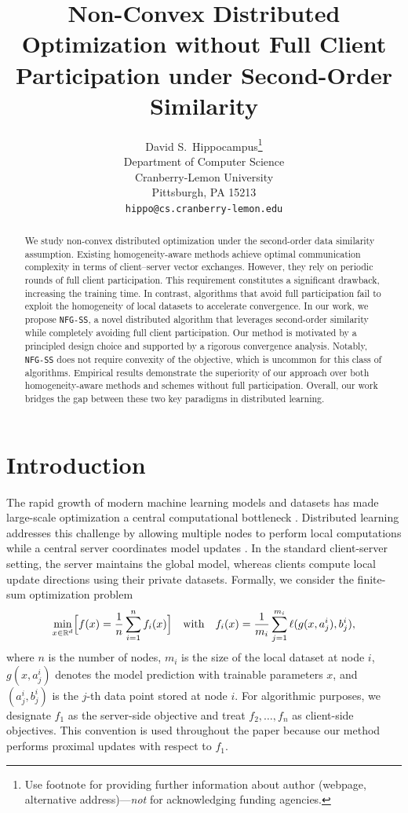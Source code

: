 \documentclass{article}
\title{Non-Convex Distributed Optimization without Full Client Participation under Second-Order Similarity}
\author{%
  David S.~Hippocampus\thanks{Use footnote for providing further information
    about author (webpage, alternative address)---\emph{not} for acknowledging
    funding agencies.} \\
  Department of Computer Science\\
  Cranberry-Lemon University\\
  Pittsburgh, PA 15213 \\
  \texttt{hippo@cs.cranberry-lemon.edu} \\
}
\begin{document}
\maketitle


\begin{abstract}
We study non-convex distributed optimization under the second-order data similarity assumption. Existing homogeneity-aware methods achieve optimal communication complexity in terms of client–server vector exchanges. However, they rely on periodic rounds of full client participation. This requirement constitutes a significant drawback, increasing the training time. In contrast, algorithms that avoid full participation fail to exploit the homogeneity of local datasets to accelerate convergence. In our work, we propose \texttt{NFG-SS}, a novel distributed algorithm that leverages second-order similarity while completely avoiding full client participation. Our method is motivated by a principled design choice and supported by a rigorous convergence analysis. Notably, \texttt{NFG-SS} does not require convexity of the objective, which is uncommon for this class of algorithms. Empirical results demonstrate the superiority of our approach over both homogeneity-aware methods and schemes without full participation. Overall, our work bridges the gap between these two key paradigms in distributed learning.
\end{abstract}

\section{Introduction}
The rapid growth of modern machine learning models and datasets has made large-scale optimization a central computational bottleneck \citep{bottou2018optimization}. Distributed learning addresses this challenge by allowing multiple nodes to perform local computations while a central server coordinates model updates \citep{verbraeken2020survey}. In the standard client-server setting, the server maintains the global model, whereas clients compute local update directions using their private datasets. Formally, we consider the finite-sum optimization problem
\begin{equation}
    \min_{x \in \mathbb{R}^d} \Bigl[f(x) = \dfrac{1}{n} \sum_{i=1}^n f_i (x)\Bigr]
    \quad \text{with} \quad f_i (x) = \dfrac{1}{m_i} \sum_{j=1}^{m_i} \ell(g(x, a_j^i), b_j^i),
\end{equation}
where $n$ is the number of nodes, $m_i$ is the size of the local dataset at node $i$, $g(x,a_j^i)$ denotes the model prediction with trainable parameters $x$, and $(a_j^i,b_j^i)$ is the $j$-th data point stored at node $i$. For algorithmic purposes, we designate $f_1$ as the server-side objective and treat $f_2,\ldots,f_n$ as client-side objectives. This convention is used throughout the paper because our method performs proximal updates with respect to $f_1$.
\end{document}
